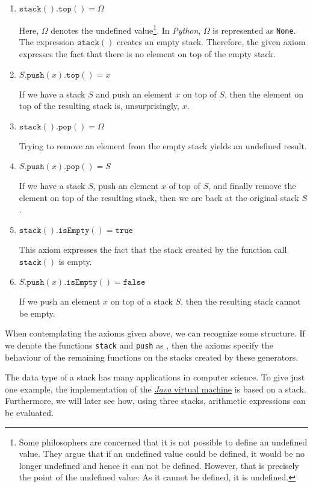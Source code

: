 \begin{enumerate}
\item $\texttt{stack}().\texttt{top}() = \Omega$

      Here, $\Omega$ denotes the undefined value\footnote{
       Some philosophers are concerned that it is not possible to define an undefined value.
       They argue that if an undefined value could be defined, it would be no longer undefined
       and hence it can not be defined.  However, that is precisely the point of the undefined 
       value: As it cannot be defined, it is undefined. \raisebox{-0.1cm}{$\Large\smiley$}}.
      In \textsl{Python}, $\Omega$ is represented as \texttt{None}. The expression $\texttt{stack}()$
      creates an empty stack.  Therefore, the given axiom expresses the fact that there is no
      element on top of the empty stack.
\item $S.\texttt{push}(x).\texttt{top}() = x$

      If we have a stack $S$ and push an element $x$ on top of $S$, then the element on top
      of the resulting stack is, unsurprisingly, $x$.
\item $\texttt{stack}().\texttt{pop}() = \Omega$

      Trying to remove an element from the empty stack yields an undefined result.
\item $S.\texttt{push}(x).\texttt{pop}() = S$

      If we have a stack $S$, push an element $x$ of top of $S$, and finally remove the element
      on top of the resulting stack, then we are back at the original stack $S$.
    
\item $\texttt{stack}().\texttt{isEmpty}() = \mathtt{true}$

      This axiom expresses the fact that the stack created by the function call $\texttt{stack}()$
      is empty.
\item $S.\texttt{push}(x).\texttt{isEmpty}() = \mathtt{false}$

      If we push an element $x$ on top of a stack $S$, then the resulting stack cannot be empty.
\end{enumerate}
When contemplating the axioms given above, we can recognize some structure.  If we denote the
functions \texttt{stack} and \texttt{push} as ,  then the axioms specify the
behaviour of the remaining functions on the stacks created by these generators.

The data type of a stack has many applications in computer science.  To give just one example, the
implementation of the \href{https://en.wikipedia.org/wiki/Java_virtual_machine}{\textsl{Java} virtual machine}
is based on a stack.  Furthermore,  we will later see how,  using three stacks, arithmetic expressions can be
evaluated. 


